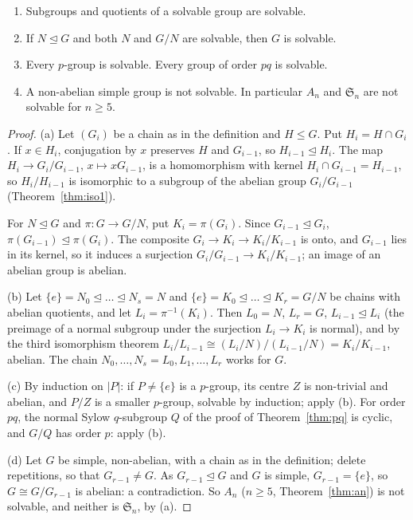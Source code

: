 \begin{proposition}\label{prop:solv}
\begin{enumerate}[label=(\alph*)]
\item Subgroups and quotients of a solvable group are solvable.
\item If $N\trianglelefteq G$ and both $N$ and $G/N$ are solvable, then $G$ is solvable.
\item Every $p$-group is solvable. Every group of order $pq$ is solvable.
\item A non-abelian simple group is not solvable. In particular $A_n$ and $\mathfrak S_n$ are not solvable for $n\ge5$.
\end{enumerate}
\end{proposition}
\begin{proof}
(a) Let $(G_i)$ be a chain as in the definition and $H\le G$. Put $H_i=H\cap G_i$. If $x\in H_i$, conjugation by $x$ preserves $H$ and $G_{i-1}$, so $H_{i-1}\trianglelefteq H_i$. The map $H_i\to G_i/G_{i-1}$, $x\mapsto xG_{i-1}$, is a homomorphism with kernel $H_i\cap G_{i-1}=H_{i-1}$, so $H_i/H_{i-1}$ is isomorphic to a subgroup of the abelian group $G_i/G_{i-1}$ (Theorem~\ref{thm:iso1}).

For $N\trianglelefteq G$ and $\pi:G\to G/N$, put $K_i=\pi(G_i)$. Since $G_{i-1}\trianglelefteq G_i$, $\pi(G_{i-1})\trianglelefteq\pi(G_i)$. The composite $G_i\to K_i\to K_i/K_{i-1}$ is onto, and $G_{i-1}$ lies in its kernel, so it induces a surjection $G_i/G_{i-1}\to K_i/K_{i-1}$; an image of an abelian group is abelian.

(b) Let $\{e\}=N_0\trianglelefteq\dots\trianglelefteq N_s=N$ and $\{e\}=K_0\trianglelefteq\dots\trianglelefteq K_r=G/N$ be chains with abelian quotients, and let $L_i=\pi^{-1}(K_i)$. Then $L_0=N$, $L_r=G$, $L_{i-1}\trianglelefteq L_i$ (the preimage of a normal subgroup under the surjection $L_i\to K_i$ is normal), and by the third isomorphism theorem $L_i/L_{i-1}\cong(L_i/N)/(L_{i-1}/N)=K_i/K_{i-1}$, abelian. The chain $N_0,\dots,N_s=L_0,L_1,\dots,L_r$ works for $G$.

(c) By induction on $|P|$: if $P\ne\{e\}$ is a $p$-group, its centre $Z$ is non-trivial and abelian, and $P/Z$ is a smaller $p$-group, solvable by induction; apply (b). For order $pq$, the normal Sylow $q$-subgroup $Q$ of the proof of Theorem~\ref{thm:pq} is cyclic, and $G/Q$ has order $p$: apply (b).

(d) Let $G$ be simple, non-abelian, with a chain as in the definition; delete repetitions, so that $G_{r-1}\ne G$. As $G_{r-1}\trianglelefteq G$ and $G$ is simple, $G_{r-1}=\{e\}$, so $G\cong G/G_{r-1}$ is abelian: a contradiction. So $A_n$ ($n\ge5$, Theorem~\ref{thm:an}) is not solvable, and neither is $\mathfrak S_n$, by (a).
\end{proof}

